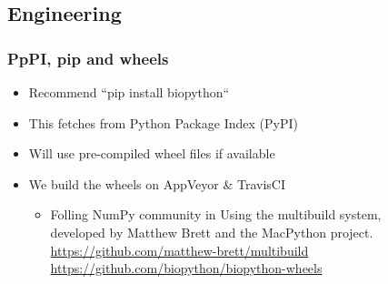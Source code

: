 \subsection{Engineering}

\begin{frame}
\frametitle{PpPI, pip and wheels}
\begin{itemize}
\item Recommend ``pip install biopython``
\item This fetches from Python Package Index (PyPI)
\item Will use pre-compiled wheel files if available
\item We build the wheels on AppVeyor \& TravisCI
    \begin{itemize}
        \item Folling NumPy community in Using the multibuild system, \\
              developed by Matthew Brett and the MacPython project. \\
              \url{https://github.com/matthew-brett/multibuild} \\
              \url{https://github.com/biopython/biopython-wheels}
    \end{itemize}
\end{itemize}
\end{frame}


